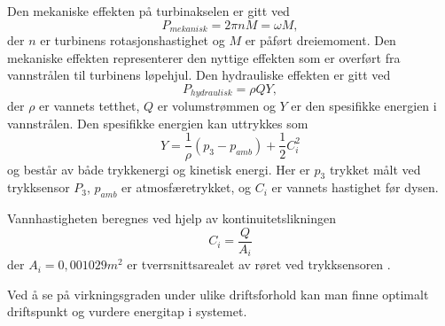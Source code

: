Den mekaniske effekten på turbinakselen er gitt ved
\[
P_{mekanisk} = 2\pi n  M = \omega  M,
\]
der $n$ er turbinens rotasjonshastighet og $M$ er påført dreiemoment. Den mekaniske effekten representerer den nyttige effekten som er overført fra vannstrålen til turbinens løpehjul.
Den hydrauliske effekten er gitt ved
\[
P_{hydraulisk} = \rho  Q  Y,
\]
der $\rho$ er vannets tetthet, $Q$ er volumstrømmen og $Y$ er den spesifikke energien i vannstrålen. Den spesifikke energien kan uttrykkes som
\[
Y = \frac{1}{\rho}(p_{3}-p_{amb})+\frac{1}{2}C_{i}^2 
\]
og består av både trykkenergi og kinetisk energi. Her er $p_{3}$ trykket målt ved trykksensor $P_{3}$, $p_{amb}$ er atmosfæretrykket, og $C_{i}$ er vannets hastighet før dysen.

Vannhastigheten beregnes ved hjelp av kontinuitetslikningen
\[
C_{i}=\frac{Q}{A_{i}}
\]
der $A_{i} = 0,001029m^2$ er tverrsnittsarealet av røret ved trykksensoren \parencite{HM4501_Pelton-Turbine}.

Ved å se på virkningsgraden under ulike driftsforhold kan man finne optimalt driftspunkt og vurdere energitap i systemet.


